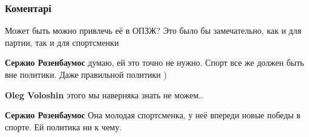  
 
 
 
 
\subsubsection{Коментарі}

\begin{itemize}
 
Может быть можно привлечь её в ОПЗЖ? Это было бы замечательно, как и для партии, так и для спортсменки

\begin{itemize}
 
\textbf{Сержио Розенбаумос} думаю, ей это точно не нужно. Спорт все же должен быть вне политики. Даже правильной политики )

 
\textbf{Oleg Voloshin} этого мы наверняка знать не можем..

 
\textbf{Сержио Розенбаумос} Она молодая спортсменка, у неё впереди новые победы в спорте. Ей политика ни к чему.

 

\end{itemize}
\end{itemize}
